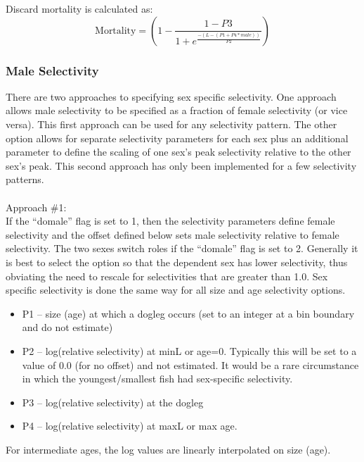 Discard mortality is calculated as:
\begin{equation}
	\text{Mortality} = \left(1 - \frac{1-P3}{1+e^{\frac{-(L-(P1+P4*male))}{P2}}}\right)
\end{equation}

\subsubsection{Male Selectivity}
There are two approaches to specifying sex specific selectivity.  One approach allows male selectivity to be specified as a fraction of female selectivity (or vice versa).  This first approach can be used for any selectivity pattern.  The other option allows for separate selectivity parameters for each sex plus an additional parameter to define the scaling of one sex’s peak selectivity relative to the other sex’s peak.  This second approach has only been implemented for a few selectivity patterns.\\
\\
Approach \#1:\\
If the “domale” flag is set to 1, then the selectivity parameters define female selectivity and the offset defined below sets male selectivity relative to female selectivity.  The two sexes switch roles if the “domale” flag is set to 2.  Generally it is best to select the option so that the dependent sex has lower selectivity, thus obviating the need to rescale for selectivities that are greater than 1.0.  Sex specific selectivity is done the same way for all size and age selectivity options.
\begin{itemize}
	\item P1 – size (age) at which a dogleg occurs (set to an integer at a bin boundary and do not estimate)
	\item P2 – log(relative selectivity) at minL or age=0.  Typically this will be set to a value of 0.0 (for no offset) and not estimated.  It would be a rare circumstance in which the youngest/smallest fish had sex-specific selectivity.
	\item P3 – log(relative selectivity) at the dogleg
	\item P4 – log(relative selectivity) at maxL or max age.
\end{itemize}

For intermediate ages, the log values are linearly interpolated on size (age).

